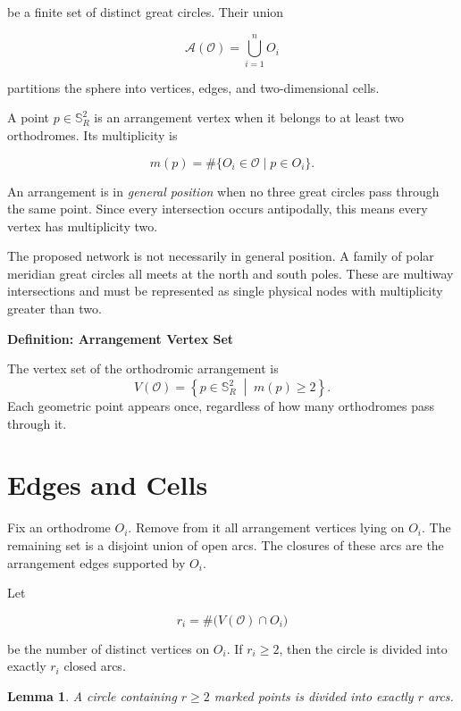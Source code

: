 \documentclass[11pt,fleqn]{book}
\numberwithin{equation}{chapter}
\newenvironment{definition}[1]
  {\begin{definitionEnv}
   \noindent\textbf{Definition: #1}\par\smallskip}
  {\end{definitionEnv}}
\theoremstyle{plain}
\newtheorem{lemma}[theorem]{Lemma}
\theoremstyle{definition}
\theoremstyle{remark}
\newcommand{\Sphere}{\mathbb{S}^{2}}
\newcommand{\Oset}{\mathcal{O}}
\newcommand{\suchthat}{\;\middle|\;}
\begin{document}
be a finite set of distinct great circles. Their union

\begin{equation}
    \mathscr{A}(\Oset)
    =
    \bigcup_{i=1}^{n}O_i
\end{equation}

partitions the sphere into vertices, edges, and two-dimensional cells.

A point \(p\in\Sphere_R\) is an arrangement vertex when it belongs to at least two orthodromes. Its multiplicity is

\begin{equation}
    m(p)
    =
    \#\{O_i\in\Oset\mid p\in O_i\}.
\end{equation}

An arrangement is in \emph{general position} when no three great circles pass through the same point. Since every intersection occurs antipodally, this means every vertex has multiplicity two.

The proposed network is not necessarily in general position. A family of polar meridian great circles all meets at the north and south poles. These are multiway intersections and must be represented as single physical nodes with multiplicity greater than two.

\begin{definition}{Arrangement Vertex Set}
The vertex set of the orthodromic arrangement is
\[
V(\Oset)
=
\left\{
p\in\Sphere_R
\suchthat
m(p)\geq 2
\right\}.
\]
Each geometric point appears once, regardless of how many orthodromes pass through it.
\end{definition}

\section{Edges and Cells}

Fix an orthodrome \(O_i\). Remove from it all arrangement vertices lying on \(O_i\). The remaining set is a disjoint union of open arcs. The closures of these arcs are the arrangement edges supported by \(O_i\).

Let

\begin{equation}
    r_i
    =
    \#\bigl(V(\Oset)\cap O_i\bigr)
\end{equation}

be the number of distinct vertices on \(O_i\). If \(r_i\geq 2\), then the circle is divided into exactly \(r_i\) closed arcs.

\begin{lemma}
A circle containing \(r\geq 2\) marked points is divided into exactly \(r\) arcs.
\end{lemma}
\end{document}

